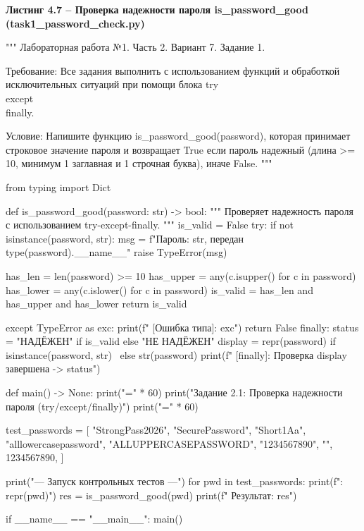 \documentclass[14pt,a4paper]{extarticle}
\newcommand{\listingtitle}[1]{%
  \par\vspace{8pt}%
  \noindent\hspace*{1.25cm}\textbf{#1}\par\vspace{2pt}%
}
\begin{document}
\listingtitle{Листинг 4.7 -- Проверка надежности пароля is\_password\_good (task1\_password\_check.py)}
\begin{CodeListing}
"""
Лабораторная работа №1. Часть 2.
Вариант 7. Задание 1.

Требование:
Все задания выполнить с использованием функций и обработкой
исключительных ситуаций при помощи блока try\\except\\finally.

Условие:
Напишите функцию is_password_good(password), которая принимает строковое
значение пароля и возвращает True если пароль надежный (длина >= 10,
минимум 1 заглавная и 1 строчная буква), иначе False.
"""

from typing import Dict


def is_password_good(password: str) -> bool:
    """
    Проверяет надежность пароля с использованием try-except-finally.
    """
    is_valid = False
    try:
        if not isinstance(password, str):
            msg = f"Пароль: str, передан {type(password).__name__}"
            raise TypeError(msg)

        has_len = len(password) >= 10
        has_upper = any(c.isupper() for c in password)
        has_lower = any(c.islower() for c in password)
        is_valid = has_len and has_upper and has_lower
        return is_valid

    except TypeError as exc:
        print(f"  [Ошибка типа]: {exc}")
        return False
    finally:
        status = "НАДЁЖЕН" if is_valid else "НЕ НАДЁЖЕН"
        display = repr(password) if isinstance(password, str) \
            else str(password)
        print(f"  [finally]: Проверка {display} завершена -> {status}")


def main() -> None:
    print("=" * 60)
    print("Задание 2.1: Проверка надежности пароля (try/except/finally)")
    print("=" * 60)

    test_passwords = [
        "StrongPass2026",
        "SecurePassword",
        "Short1Aa",
        "alllowercasepassword",
        "ALLUPPERCASEPASSWORD",
        "1234567890",
        "",
        1234567890,
    ]

    print("\n--- Запуск контрольных тестов ---")
    for pwd in test_passwords:
        print(f": {repr(pwd)}")
        res = is_password_good(pwd)
        print(f"  Результат: {res}")


if __name__ == "__main__":
    main()
\end{CodeListing}
\end{document}
